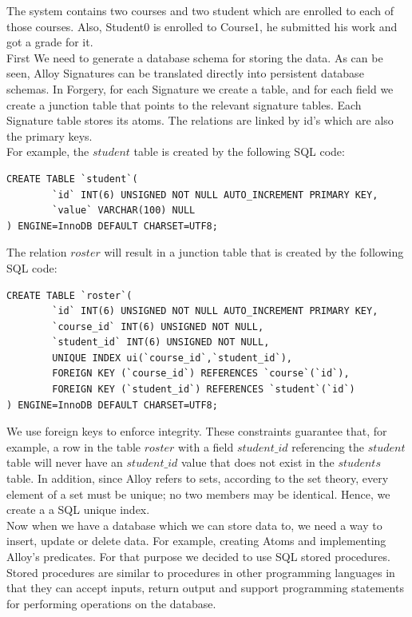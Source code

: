 \documentclass[oneside]{book}
\begin{document}
The system contains two courses and two student which are enrolled to each of those courses. Also, Student0 is enrolled to Course1, he submitted his work and got a grade for it.\\

First We need to generate a database schema for storing the data. As can be seen, Alloy Signatures can be translated directly into persistent database schemas. In Forgery, for each Signature we create a table, and for each field we create a junction table that points to the relevant signature tables. Each Signature table stores its atoms. The relations are linked by id's which are also the primary keys.\\

For example, the $student$ table is created by the following SQL code:

\begin{lstlisting}
CREATE TABLE `student`(
        `id` INT(6) UNSIGNED NOT NULL AUTO_INCREMENT PRIMARY KEY,
        `value` VARCHAR(100) NULL
) ENGINE=InnoDB DEFAULT CHARSET=UTF8;
\end{lstlisting}

The relation $roster$ will result in a junction table that is created by the following SQL code:

\begin{lstlisting}
CREATE TABLE `roster`(
        `id` INT(6) UNSIGNED NOT NULL AUTO_INCREMENT PRIMARY KEY,
        `course_id` INT(6) UNSIGNED NOT NULL,
        `student_id` INT(6) UNSIGNED NOT NULL,
        UNIQUE INDEX ui(`course_id`,`student_id`),
        FOREIGN KEY (`course_id`) REFERENCES `course`(`id`),
        FOREIGN KEY (`student_id`) REFERENCES `student`(`id`)
) ENGINE=InnoDB DEFAULT CHARSET=UTF8;
\end{lstlisting}

We use foreign keys to enforce integrity. These constraints guarantee that, for example, a row in the table $roster$ with a field $student\_id$ referencing the $student$ table will never have an $student\_id$ value that does not exist in the $students$ table. In addition, since Alloy refers to sets, according to the set theory, every element of a set must be unique; no two members may be identical. Hence, we create a a SQL unique index.\\

Now when we have a database which we can store data to, we need a way to insert, update or delete data. For example, creating Atoms and implementing Alloy's predicates. For that purpose we decided to use SQL stored procedures. Stored procedures are similar to procedures in other programming languages in that they can accept inputs, return output and support programming statements for performing operations on the database.\\
\end{document}
